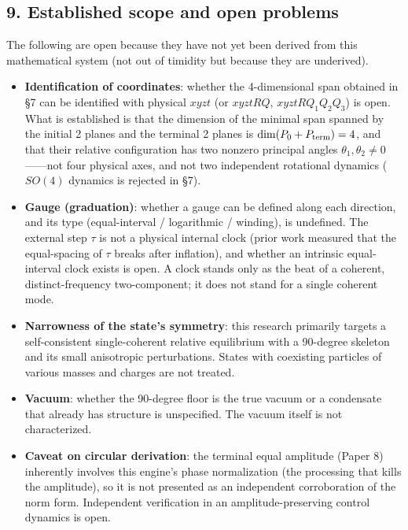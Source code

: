 \documentclass[
  a4paper,
]{ltjsarticle}
\providecommand{\tightlist}{%
  \setlength{\itemsep}{0pt}\setlength{\parskip}{0pt}}
\begin{document}
\subsection{9. Established scope and open
problems}\label{established-scope-and-open-problems}

The following are open because they have not yet been derived from this
mathematical system (not out of timidity but because they are
underived).

\begin{itemize}
\tightlist
\item
  \textbf{Identification of coordinates}: whether the 4-dimensional span
  obtained in §7 can be identified with physical \(xyzt\) (or
  \(xyztRQ\), \(xyztRQ_1Q_2Q_3\)) is open. What is established is that
  the dimension of the minimal span spanned by the initial 2 planes and
  the terminal 2 planes is \(\dim(P_0+P_{\rm term})=4\), and that their
  relative configuration has two nonzero principal angles
  \(\theta_1,\theta_2\neq0\)------not four physical axes, and not two
  independent rotational dynamics (\(SO(4)\) dynamics is rejected in
  §7).
\item
  \textbf{Gauge (graduation)}: whether a gauge can be defined along each
  direction, and its type (equal-interval / logarithmic / winding), is
  undefined. The external step \(\tau\) is not a physical internal clock
  (prior work measured that the equal-spacing of \(\tau\) breaks after
  inflation), and whether an intrinsic equal-interval clock exists is
  open. A clock stands only as the beat of a coherent,
  distinct-frequency two-component; it does not stand for a single
  coherent mode.
\item
  \textbf{Narrowness of the state's symmetry}: this research primarily
  targets a self-consistent single-coherent relative equilibrium with a
  90-degree skeleton and its small anisotropic perturbations. States
  with coexisting particles of various masses and charges are not
  treated.
\item
  \textbf{Vacuum}: whether the 90-degree floor is the true vacuum or a
  condensate that already has structure is unspecified. The vacuum
  itself is not characterized.
\item
  \textbf{Caveat on circular derivation}: the terminal equal amplitude
  (Paper 8) inherently involves this engine's phase normalization (the
  processing that kills the amplitude), so it is not presented as an
  independent corroboration of the norm form. Independent verification
  in an amplitude-preserving control dynamics is open.

\end{itemize}
\end{document}
